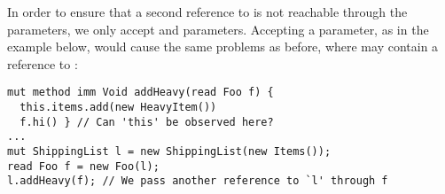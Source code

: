 In order to ensure that a second reference to \Q@this@ is not reachable through the parameters, we only accept \Q@imm@ and \Q@capsule@ parameters.
Accepting a \Q@read@ parameter, as in the example below,
would cause the same problems as before, where \Q@f@ may contain
a reference to \Q@this@:
\begin{lstlisting}
mut method imm Void addHeavy(read Foo f) {
  this.items.add(new HeavyItem())
  f.hi() } // Can 'this' be observed here?
...
mut ShippingList l = new ShippingList(new Items());
read Foo f = new Foo(l);
l.addHeavy(f); // We pass another reference to `l' through f
\end{lstlisting}%
%
%
%
